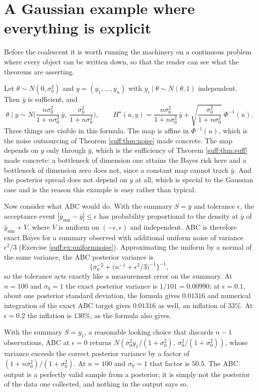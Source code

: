 \section{A Gaussian example where everything is explicit}
\label{suff:sec:toy}

Before the coalescent it is worth running the machinery on a continuous problem where every
object can be written down, so that the reader can see what the theorems are asserting.

Let $\theta\sim N(0,\sigma_0^2)$ and $y=(y_1,\dots,y_n)$ with $y_i\mid\theta\sim N(\theta,1)$
independent. Then $\bar y$ is sufficient, and
\[
\theta\mid y \sim N\Big(\frac{n\sigma_0^2}{1+n\sigma_0^2}\,\bar y,\
\frac{\sigma_0^2}{1+n\sigma_0^2}\Big),
\qquad
H^\star(u,y)=\frac{n\sigma_0^2}{1+n\sigma_0^2}\,\bar y
+\sqrt{\frac{\sigma_0^2}{1+n\sigma_0^2}}\ \Phi^{-1}(u) .
\]
Three things are visible in this formula. The map is affine in $\Phi^{-1}(u)$, which is the
noise outsourcing of Theorem \ref{suff:thm:noise} made concrete. The map depends on $y$ only
through $\bar y$, which is the sufficiency of Theorem \ref{suff:thm:suff} made concrete: a
bottleneck of dimension one attains the Bayes risk here and a bottleneck of dimension zero
does not, since a constant map cannot track $\bar y$. And the posterior spread does not
depend on $y$ at all, which is special to the Gaussian case and is the reason this example is
easy rather than typical.

Now consider what ABC would do. With the summary $S=\bar y$ and tolerance $\epsilon$, the
acceptance event $|\bar y_{\mathrm{sim}}-\bar y|\le\epsilon$ has probability proportional to
the density at $\bar y$ of $\bar y_{\mathrm{sim}}+V$, where $V$ is uniform on
$(-\epsilon,\epsilon)$ and independent. ABC is therefore exact Bayes for a summary observed
with additional uniform noise of variance $\epsilon^2/3$ (Exercise \ref{suff:ex:uniformnoise}).
Approximating the uniform by a normal of the same variance, the ABC posterior variance is
\[
\Big\{\sigma_0^{-2}+\big(n^{-1}+\epsilon^2/3\big)^{-1}\Big\}^{-1},
\]
so the tolerance acts exactly like a measurement error on the summary. At $n=100$ and
$\sigma_0=1$ the exact posterior variance is $1/101=0.00990$; at $\epsilon=0.1$, about one
posterior standard deviation, the formula gives $0.01316$ and numerical integration of the
exact ABC target gives $0.01316$ as well, an inflation of $33\%$. At $\epsilon=0.2$ the
inflation is $130\%$, as the formula also gives.

With the summary $S=y_1$, a reasonable looking choice that discards $n-1$ observations, ABC at
$\epsilon=0$ returns $N(\sigma_0^2 y_1/(1+\sigma_0^2),\ \sigma_0^2/(1+\sigma_0^2))$, whose
variance exceeds the correct posterior variance by a factor of
$(1+n\sigma_0^2)/(1+\sigma_0^2)$. At $n=100$ and $\sigma_0=1$ that factor is $50.5$. The ABC
output is a perfectly valid sample from a posterior; it is simply not the posterior of the
data one collected, and nothing in the output says so.

